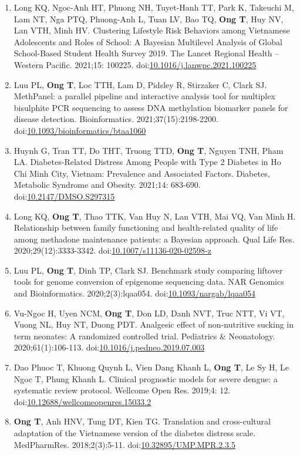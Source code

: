 \documentclass[
  12pt,
  a4paper,
]{article}
\begin{document}
\begin{enumerate}
\item
  Long KQ, Ngoc-Anh HT, Phuong NH, Tuyet-Hanh TT, Park K, Takeuchi M,
  Lam NT, Nga PTQ, Phuong-Anh L, Tuan LV, Bao TQ, \textbf{Ong T}, Huy
  NV, Lan VTH, Minh HV. Clustering Lifestyle Risk Behaviors among
  Vietnamese Adolescents and Roles of School: A Bayesian Multilevel
  Analysis of Global School-Based Student Health Survey 2019. The Lancet
  Regional Health -- Western Pacific. 2021;15: 100225.
  doi:\href{https://doi.org/10.1016/j.lanwpc.2021.100225}{10.1016/j.lanwpc.2021.100225}
\item
  Luu PL, \textbf{Ong T}, Loc TTH, Lam D, Pidsley R, Stirzaker C, Clark
  SJ. MethPanel: a parallel pipeline and interactive analysis tool for
  multiplex bisulphite PCR sequencing to assess DNA methylation
  biomarker panels for disease detection. Bioinformatics.
  2021;37(15):2198-2200.
  doi:\href{https://doi.org/10.1093/bioinformatics/btaa1060}{10.1093/bioinformatics/btaa1060}
\item
  Huynh G, Tran TT, Do THT, Truong TTD, \textbf{Ong T}, Nguyen TNH, Pham
  LA. Diabetes-Related Distress Among People with Type 2 Diabetes in Ho
  Chi Minh City, Vietnam: Prevalence and Associated Factors. Diabetes,
  Metabolic Syndrome and Obesity. 2021;14: 683-690.
  doi:\href{https://doi.org/10.2147/DMSO.S297315}{10.2147/DMSO.S297315}
\item
  Long KQ, \textbf{Ong T}, Thao TTK, Van Huy N, Lan VTH, Mai VQ, Van
  Minh H. Relationship between family functioning and health-related
  quality of life among methadone maintenance patients: a Bayesian
  approach. Qual Life Res. 2020;29(12):3333-3342.
  doi:\href{https://doi.org/10.1007/s11136-020-02598-z}{10.1007/s11136-020-02598-z}
\item
  Luu PL, \textbf{Ong T}, Dinh TP, Clark SJ. Benchmark study comparing
  liftover tools for genome conversion of epigenome sequencing data. NAR
  Genomics and Bioinformatics. 2020;2(3):lqaa054.
  doi:\href{https://doi.org/10.1093/nargab/lqaa054}{10.1093/nargab/lqaa054}
\item
  Vu-Ngoc H, Uyen NCM, \textbf{Ong T}, Don LD, Danh NVT, Truc NTT, Vi
  VT, Vuong NL, Huy NT, Duong PDT. Analgesic effect of non-nutritive
  sucking in term neonates: A randomized controlled trial. Pediatrics \&
  Neonatology. 2020;61(1):106-113.
  doi:\href{https://doi.org/10.1016/j.pedneo.2019.07.003}{10.1016/j.pedneo.2019.07.003}
\item
  Dao Phuoc T, Khuong Quynh L, Vien Dang Khanh L, \textbf{Ong T}, Le Sy
  H, Le Ngoc T, Phung Khanh L. Clinical prognostic models for severe
  dengue: a systematic review protocol. Wellcome Open Res. 2019;4: 12.
  doi:\href{https://doi.org/10.12688/wellcomeopenres.15033.2}{10.12688/wellcomeopenres.15033.2}
\item
  \textbf{Ong T}, Anh HNV, Tung DT, Kien TG. Translation and
  cross-cultural adaptation of the Vietnamese version of the diabetes
  distress scale. MedPharmRes. 2018;2(3):5-11.
  doi:\href{https://doi.org/10.32895/UMP.MPR.2.3.5}{10.32895/UMP.MPR.2.3.5}
\end{enumerate}
\end{document}
